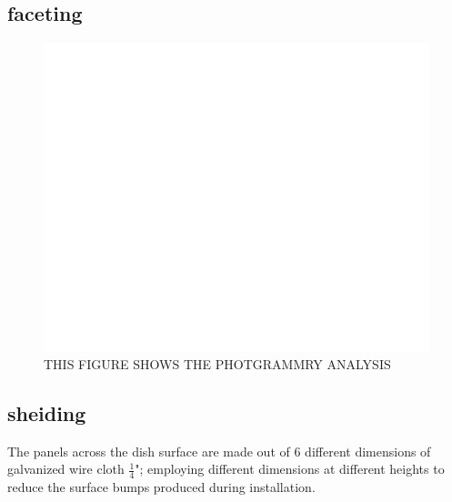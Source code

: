 \documentclass[preprint]{aastex}  %
\begin{document}
\subsection{faceting}
\begin{figure}[H]
	\begin{center}
	\includegraphics[width =\textwidth]{empty}
	\caption{THIS FIGURE SHOWS THE PHOTGRAMMRY ANALYSIS 
\label{Fig:} }
	\end{center}
\end{figure}

\subsection{sheiding}
The panels across the dish surface are made out of 6 different dimensions of galvanized wire cloth $\frac{1}{4}$"; employing different dimensions at different heights to reduce the surface bumps produced during installation.
\end{document}
